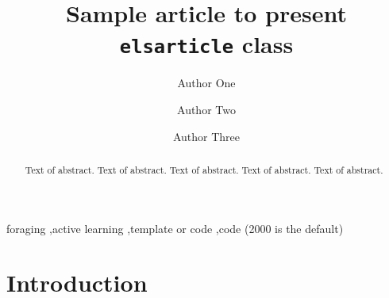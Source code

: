 \documentclass[preprint,12pt,3p]{elsarticle}
\begin{document}
\begin{frontmatter}

\title{Sample article to present \texttt{elsarticle} class}


\author[label1,label2]{Author One}
\address[label1]{Address One}
\address[label2]{Address Two}



\author[label5]{Author Two}
\address[label5]{Some University}

\author[label1,label5]{Author Three}

\begin{abstract}
Text of abstract. Text of abstract. Text of abstract. Text of abstract. Text of abstract. 
\end{abstract}

\begin{keyword}
foraging \sep active learning \sep template
 or \MSC[2008] code \sep code (2000 is the default)
\end{keyword}

\end{frontmatter}


\section{Introduction}
\label{sec:intro}
\end{document}
